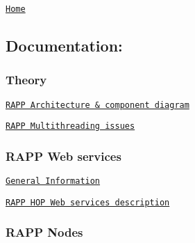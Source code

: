 \href{https://github.com/rapp-project/rapp-platform/wiki}{\tt Home}

\subsection*{Documentation\-:}

\subsubsection*{Theory}


\begin{DoxyItemize}
\item \href{https://github.com/rapp-project/rapp-platform/wiki/RAPP-Architecture}{\tt R\-A\-P\-P Architecture \& component diagram}
\item \href{https://github.com/rapp-project/rapp-platform/wiki/RAPP-Multithreading-issues}{\tt R\-A\-P\-P Multithreading issues}
\end{DoxyItemize}

\subsubsection*{R\-A\-P\-P Web services}


\begin{DoxyItemize}
\item \href{https://github.com/rapp-project/rapp-platform/wiki/HOP-Services---General-Information}{\tt General Information}
\item \href{https://github.com/rapp-project/rapp-platform/wiki/RAPP-HOP-Web-services}{\tt R\-A\-P\-P H\-O\-P Web services description}
\end{DoxyItemize}

\subsubsection*{R\-A\-P\-P Nodes}


